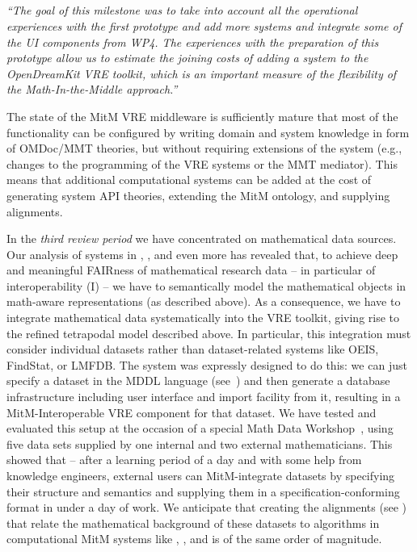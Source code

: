\subparagraph{}
\emph{“The goal of this milestone was to take into account all the operational experiences with the first prototype and add more systems and integrate some of the UI components from WP4.
  The experiences with the preparation of this prototype allow us to estimate the joining costs of adding a system to the OpenDreamKit VRE toolkit, which is an important measure of the flexibility of the Math-In-the-Middle approach.”}

The state of the MitM VRE middleware is sufficiently mature that most of the functionality can be configured by writing domain and system knowledge in form of OMDoc/MMT theories, but without requiring extensions of the system (e.g., changes to the programming of the VRE systems or the MMT mediator).
This means that additional computational systems can be added at the cost of generating system API theories, extending the MitM ontology, and supplying alignments.

In the \emph{third review period} we have concentrated on mathematical data sources.
Our analysis of systems in , , and even more  has revealed that, to achieve deep and meaningful FAIRness of mathematical research data -- in particular of interoperability (I) -- we have to semantically model the mathematical objects in math-aware representations (as described above).
As a consequence, we have to integrate mathematical data systematically into the \pn VRE toolkit, giving rise to the refined tetrapodal model described above. In particular, this integration must consider individual datasets rather than dataset-related systems like OEIS, FindStat, or LMFDB.
The \dmh system was expressly designed to do this: we can just specify a dataset in the MDDL language (see~\cite{BerKohRab:tumdi19,ODK-D6.10}) and then generate a database infrastructure including user interface and import facility from it, resulting in a MitM-Interoperable VRE component for that dataset.
We have tested and evaluated this setup at the occasion of a special Math Data Workshop~\cite{ODK-WDM19}, using five data sets supplied by one internal and two external mathematicians.
This showed that -- after a learning period of a day and with some help from \pn knowledge engineers, external users can MitM-integrate datasets by specifying their structure and semantics and supplying them in a specification-conforming format in under a day of work.
We anticipate that creating the alignments (see \cite{ODK-D6.5}) that relate the mathematical background of these datasets to algorithms in computational MitM systems like \GAP, \Sage, and \Singular is of the same order of magnitude. 


